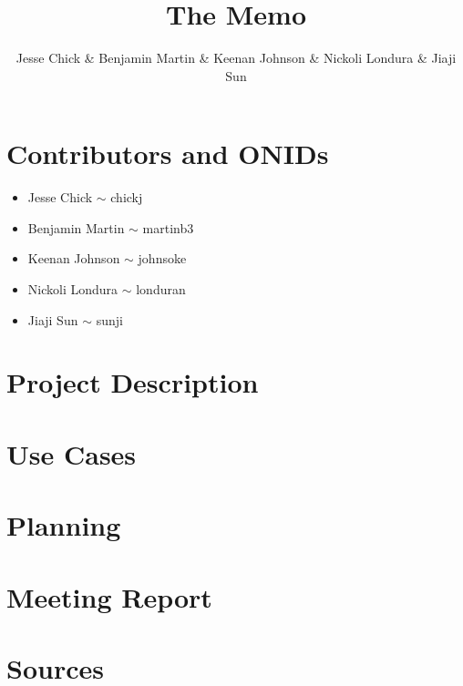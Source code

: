 \documentclass[12pt]{article}
\title{The Memo}
\author{Jesse Chick \& Benjamin Martin \& Keenan Johnson \& Nickoli Londura \& Jiaji Sun}
\begin{document}
\maketitle
\tableofcontents

\section{Contributors and ONIDs}
\begin{itemize}
	\item Jesse Chick $\sim$ chickj
	\item Benjamin Martin $\sim$ martinb3
	\item Keenan Johnson $\sim$ johnsoke
	\item Nickoli Londura $\sim$ londuran
	\item Jiaji Sun $\sim$ sunji
\end{itemize}

\section{Project Description}


\section{Use Cases}


\section{Planning}


\section{Meeting Report}


\section{Sources}
\end{document}
